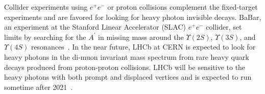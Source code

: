 \indent Collider experiments using $e^+e^-$ or proton collisions complement the fixed-target experiments and are favored for looking for heavy photon invisible decays.  BaBar, an experiment at the Stanford Linear Accelerator (SLAC) $e^+e^-$ collider, set limits by searching for the $A^{\prime}$ in missing mass around the $\Upsilon(2S)$, $\Upsilon(3S)$, and $\Upsilon(4S)$ resonances~\cite{Lees_2014xha}. In the near future, LHCb at CERN is expected to look for heavy photons in the di-muon invariant mass spectrum from rare heavy quark decays produced from proton-proton collisions. LHCb will be sensitive to the heavy photons with both prompt and displaced vertices and is expected to run sometime after 2021~\cite{Ilten_2016tkc}.
